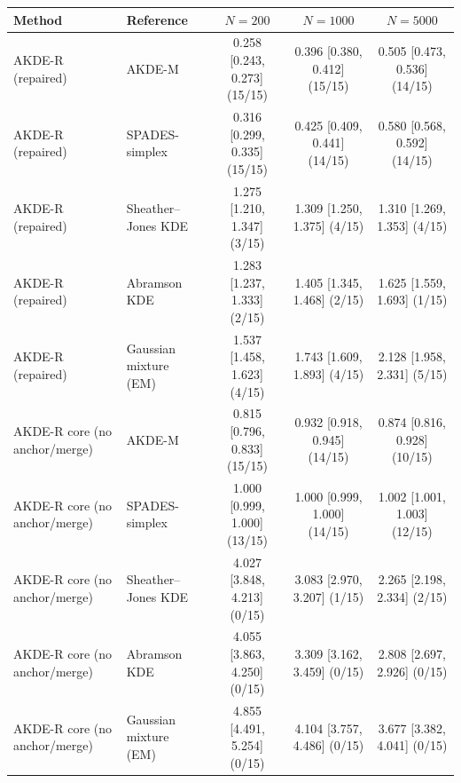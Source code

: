 \begin{tabular}{llccc}
\toprule
Method & Reference & $N=200$ & $N=1000$ & $N=5000$ \\
\midrule
AKDE-R (repaired) & AKDE-M & 0.258 [0.243, 0.273] (15/15) & 0.396 [0.380, 0.412] (15/15) & 0.505 [0.473, 0.536] (14/15) \\
AKDE-R (repaired) & SPADES-simplex & 0.316 [0.299, 0.335] (15/15) & 0.425 [0.409, 0.441] (14/15) & 0.580 [0.568, 0.592] (14/15) \\
AKDE-R (repaired) & Sheather--Jones KDE & 1.275 [1.210, 1.347] (3/15) & 1.309 [1.250, 1.375] (4/15) & 1.310 [1.269, 1.353] (4/15) \\
AKDE-R (repaired) & Abramson KDE & 1.283 [1.237, 1.333] (2/15) & 1.405 [1.345, 1.468] (2/15) & 1.625 [1.559, 1.693] (1/15) \\
AKDE-R (repaired) & Gaussian mixture (EM) & 1.537 [1.458, 1.623] (4/15) & 1.743 [1.609, 1.893] (4/15) & 2.128 [1.958, 2.331] (5/15) \\
AKDE-R core (no anchor/merge) & AKDE-M & 0.815 [0.796, 0.833] (15/15) & 0.932 [0.918, 0.945] (14/15) & 0.874 [0.816, 0.928] (10/15) \\
AKDE-R core (no anchor/merge) & SPADES-simplex & 1.000 [0.999, 1.000] (13/15) & 1.000 [0.999, 1.000] (14/15) & 1.002 [1.001, 1.003] (12/15) \\
AKDE-R core (no anchor/merge) & Sheather--Jones KDE & 4.027 [3.848, 4.213] (0/15) & 3.083 [2.970, 3.207] (1/15) & 2.265 [2.198, 2.334] (2/15) \\
AKDE-R core (no anchor/merge) & Abramson KDE & 4.055 [3.863, 4.250] (0/15) & 3.309 [3.162, 3.459] (0/15) & 2.808 [2.697, 2.926] (0/15) \\
AKDE-R core (no anchor/merge) & Gaussian mixture (EM) & 4.855 [4.491, 5.254] (0/15) & 4.104 [3.757, 4.486] (0/15) & 3.677 [3.382, 4.041] (0/15) \\
\bottomrule
\end{tabular}